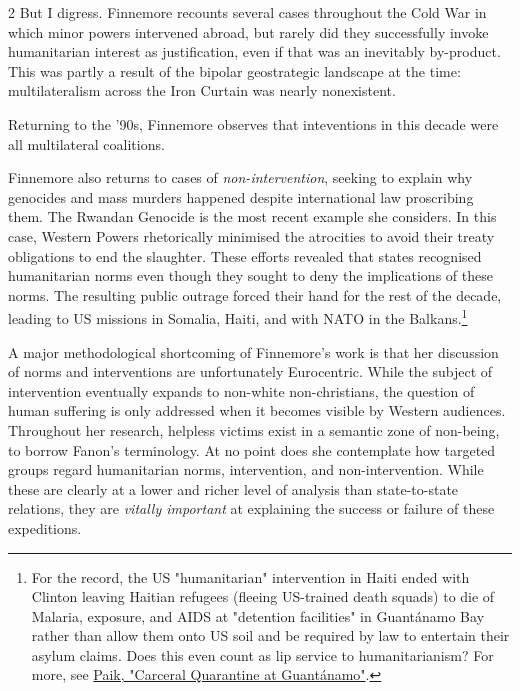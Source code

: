 \documentclass[letterpaper,12pt,twoside]{article}
\begin{document}
\begin {multicols}{2}
But I digress. Finnemore recounts several cases throughout the Cold War in which minor powers intervened abroad, but rarely did they successfully invoke humanitarian interest as justification, even if that was an inevitably by-product. This was partly a result of the bipolar geostrategic landscape at the time: multilateralism across the Iron Curtain was nearly nonexistent.

Returning to the '90s, Finnemore observes that inteventions in this decade were all multilateral coalitions.

Finnemore also returns to cases of \textit{non-intervention}, seeking to explain why genocides and mass murders happened despite international law proscribing them. The Rwandan Genocide is the most recent example she considers. In this case, Western Powers rhetorically minimised the atrocities to avoid their treaty obligations to end the slaughter. These efforts revealed that states recognised humanitarian norms even though they sought to deny the implications of these norms. The resulting public outrage forced their hand for the rest of the decade, leading to US missions in Somalia, Haiti, and with NATO in the Balkans.\footnote{
  For the record, the US "humanitarian" intervention in Haiti ended with Clinton leaving Haitian refugees (fleeing US-trained death squads) to die of Malaria, exposure, and AIDS at "detention facilities" in Guantánamo Bay rather than allow them onto US soil and be required by law to entertain their asylum claims. Does this even count as lip service to humanitarianism? For more, see \href{https://doi.org/10.1215/01636545-1724751}{Paik, "Carceral Quarantine at Guantánamo"}.
}

A major methodological shortcoming of Finnemore's work is that her discussion of norms and interventions are unfortunately Eurocentric. While the subject of intervention eventually expands to non-white non-christians, the question of human suffering is only addressed when it becomes visible by Western audiences. Throughout her research, helpless victims exist in a semantic zone of non-being, to borrow Fanon's terminology. At no point does she contemplate how targeted groups regard humanitarian norms, intervention, and non-intervention. While these are clearly at a lower and richer level of analysis than state-to-state relations, they are \textit{vitally important} at explaining the success or failure of these expeditions. %


\end{multicols}
\end{document}
